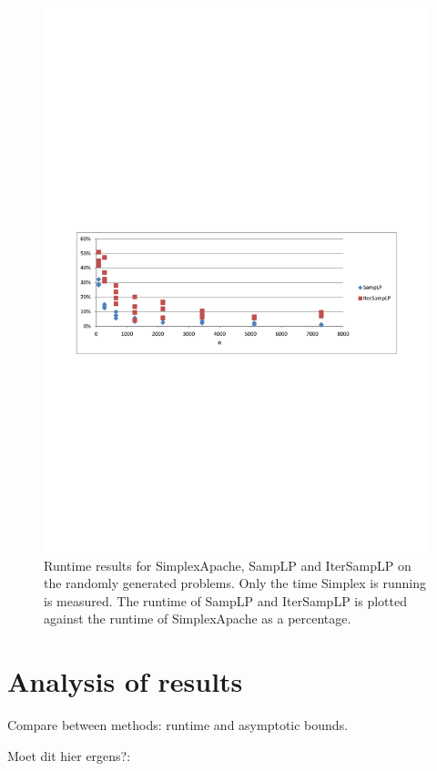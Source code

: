 \documentclass[nocopyrightspace]{acm_proc_article-sp}
\begin{document}
\begin{figure}[h!]
\includegraphics[width=\columnwidth]{../Results/simplexruntime_relative_simplex.pdf}
\caption{Runtime results for SimplexApache, SampLP and IterSampLP on the randomly generated problems. Only the time Simplex is running is measured. The runtime of SampLP and IterSampLP is plotted against the runtime of SimplexApache as a percentage.}
\label{fig:simplexruntime_relative_simplex}
\end{figure}



\section{Analysis of results}
Compare between methods: runtime and asymptotic bounds.

Moet dit hier ergens?:
\end{document}
